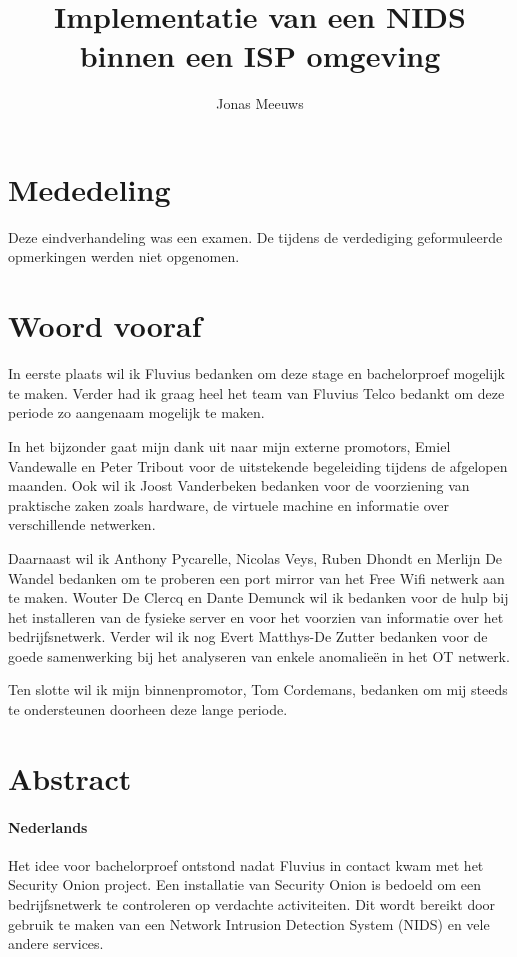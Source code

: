 \documentclass[a4paper, 12pt]{report}
\title{Implementatie van een NIDS binnen een ISP omgeving}
\author{Jonas Meeuws}
\begin{document}


\newpage
\thispagestyle{empty}
\mbox{}



\setcounter{page}{2} %
\chapter*{Mededeling}
Deze eindverhandeling was een examen.
De tijdens de verdediging geformuleerde opmerkingen werden niet opgenomen.

\chapter*{Woord vooraf}
In eerste plaats wil ik Fluvius bedanken om deze stage en bachelorproef mogelijk te maken.
Verder had ik graag heel het team van Fluvius Telco bedankt om deze periode zo aangenaam mogelijk te maken.

In het bijzonder gaat mijn dank uit naar mijn externe promotors, Emiel Vandewalle en Peter Tribout voor de uitstekende begeleiding tijdens de afgelopen maanden.
Ook wil ik Joost Vanderbeken bedanken voor de voorziening van praktische zaken zoals hardware, de virtuele machine en informatie over verschillende netwerken.

Daarnaast wil ik Anthony Pycarelle, Nicolas Veys, Ruben Dhondt en Merlijn De Wandel bedanken om te proberen een port mirror van het Free Wifi netwerk aan te maken.
Wouter De Clercq en Dante Demunck wil ik bedanken voor de hulp bij het installeren van de fysieke server en voor het voorzien van informatie over het bedrijfsnetwerk.
Verder wil ik nog Evert Matthys-De Zutter bedanken voor de goede samenwerking bij het analyseren van enkele anomalieën in het OT netwerk.

Ten slotte wil ik mijn binnenpromotor, Tom Cordemans, bedanken om mij steeds te ondersteunen doorheen deze lange periode.

\chapter*{Abstract}
\subsubsection{Nederlands}
Het idee voor bachelorproef ontstond nadat Fluvius in contact kwam met het Security Onion project.
Een installatie van Security Onion is bedoeld om een bedrijfsnetwerk te controleren op verdachte activiteiten.
Dit wordt bereikt door gebruik te maken van een Network Intrusion Detection System (NIDS) en vele andere services.
\end{document}
